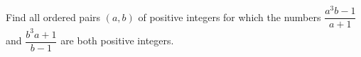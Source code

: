 Find all ordered pairs $(a,b)$ of positive integers for which the numbers $\dfrac{a^3b-1}{a+1}$ and $\dfrac{b^3a+1}{b-1}$ are both positive integers.